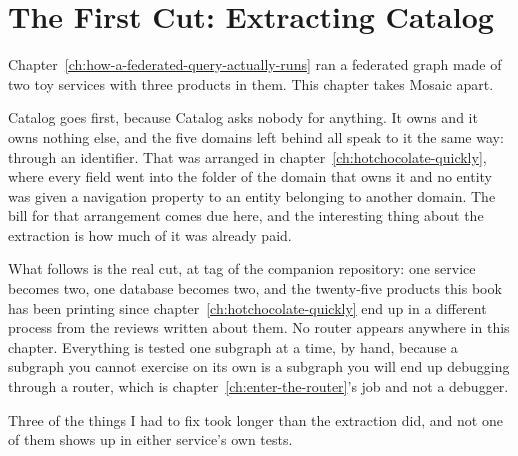 \chapter{The First Cut: Extracting Catalog}
\label{ch:the-first-cut-extracting-catalog}

Chapter~\ref{ch:how-a-federated-query-actually-runs} ran a federated graph made
of two toy services with three products in them. This chapter takes Mosaic
apart.

Catalog goes first, because Catalog asks nobody for anything. It owns
 and it owns nothing else, and the five domains left behind all
speak to it the same way: through an identifier. That was arranged in
chapter~\ref{ch:hotchocolate-quickly}, where every field went into the folder of
the domain that owns it and no entity was given a navigation property to an
entity belonging to another domain. The bill for that arrangement comes due
here, and the interesting thing about the extraction is how much of it was
already paid.

What follows is the real cut, at tag  of the companion repository:
one service becomes two, one database becomes two, and the twenty-five products
this book has been printing since chapter~\ref{ch:hotchocolate-quickly} end up
in a different process from the reviews written about them. No router appears
anywhere in this chapter. Everything is tested one subgraph at a time, by hand,
because a subgraph you cannot exercise on its own is a subgraph you will end up
debugging through a router, which is chapter~\ref{ch:enter-the-router}'s job and
not a debugger.

Three of the things I had to fix took longer than the extraction did, and not
one of them shows up in either service's own tests.








